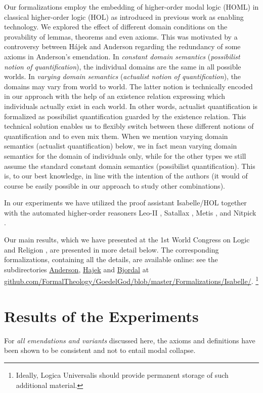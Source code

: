 \documentclass{birkjour}
\theoremstyle{definition}
\theoremstyle{remark}
\numberwithin{equation}{section}
\begin{document}
Our formalizations employ the embedding of higher-order modal logic
(HOML) in classical higher-order logic (HOL) as introduced in previous
work \citep{C40,J23} as enabling technology.  We explored the effect
of different domain conditions on the provability of lemmas, theorems
and even axioms.  This was motivated by a controversy between Hájek
and Anderson regarding the redundancy of some axioms in Anderson's
emendation. In \emph{constant domain semantics} (\emph{possibilist
  notion of quantification}), the individual domains are the same in
all possible worlds. In \emph{varying domain semantics}
(\emph{actualist notion of quantification}), the domains may vary from
world to world. The latter notion is technically encoded in our
approach with the help of an existence relation expressing which
individuals actually exist in each world. In other words, actualist
quantification is formalized as possibilist quantification guarded by
the existence relation. This technical solution
enables us to flexibly switch between these different notions of
quantification and to even mix them. When we mention varying
domain semantics (actualist quantification) below, we in fact mean
varying domain semantics for the domain of individuals only, while for
the other types we still assume the standard constant domain semantics
(possibilist quantification).  This is, to our best knowledge, in line 
with the intention of the authors (it would of course be easily
possible in our approach to study other combinations).  

In our
experiments we have utilized the proof assistant Isabelle/HOL
\citep{Isabelle} together with the automated higher-order reasoners
Leo-II \citep{Leo-II}, Satallax \citep{Satallax}, Metis
\citep{Hurd03first-orderproof}, and Nitpick \citep{Nitpick}.

Our main results, which we have
presented at the 1st World Congress on Logic and Religion \citep{C41},
are presented in more detail below. The corresponding formalizations,
containing all the details, are available online: see the
subdirectories \url{Anderson}, \url{Hajek} and \url{Bjordal} at
\url{github.com/FormalTheology/GoedelGod/blob/master/Formalizations/Isabelle/}.
\footnote{Ideally, Logica Universalis should provide
  permanent storage of such additional material.}



\section{Results of the Experiments}
For \emph{all emendations and variants} discussed here, the axioms and
definitions have been shown to be consistent and not to entail modal
collapse. 
\end{document}

